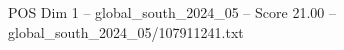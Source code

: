 \begin{textsample}{POS Dim 1 – global\_south\_2024\_05 – Score 21.00 – global\_south\_2024\_05/107911241.txt}
\end{textsample}
